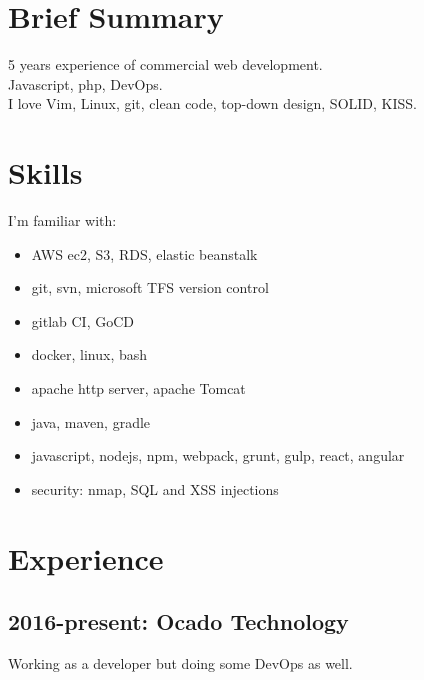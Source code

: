 \documentclass[a4paper, 14pt]{article}
\begin{document}
\begin{center}
	\textsc{\Huge{}}
\end{center}


\section{Brief Summary}
  5 years experience of commercial web development. \\
  Javascript, php, DevOps. \\
  I love Vim, Linux, git, clean code, top-down design, SOLID, KISS.

\section{Skills}
  I'm familiar with:
	\begin{itemize}
		\item AWS ec2, S3, RDS, elastic beanstalk \\
		\item git, svn, microsoft TFS version control \\
		\item gitlab CI, GoCD \\
		\item docker, linux, bash \\
		\item apache http server, apache Tomcat \\
		\item java, maven, gradle \\
		\item javascript, nodejs, npm, webpack, grunt, gulp, react, angular \\
		\item security: nmap, SQL and XSS injections
	\end{itemize}

\section{Experience}
  \subsection{2016-present: Ocado Technology}
		Working as a developer but doing some DevOps as well.
\end{document}
